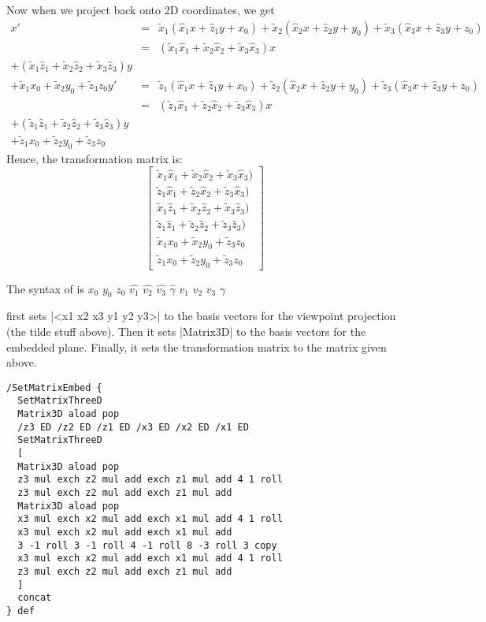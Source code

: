 \documentclass[11pt,english,BCOR10mm,DIV12,bibliography=totoc,parskip=false,smallheadings
    headexclude,footexclude,oneside,dvipsnames,svgnames]{pst-doc}
\begin{document}
 Now when we project back onto 2D coordinates, we get
 \begin{eqnarray*}
   x' & = & \tilde{x}_1(\hat{x}_1 x + \hat{z}_1 y + x_0) +
            \tilde{x}_2(\hat{x}_2 x + \hat{z}_2 y + y_0) +
            \tilde{x}_3(\hat{x}_3 x + \hat{z}_3 y + z_0)\\
   & = &
   (\tilde{x}_1\hat{x}_1 + \tilde{x}_2\hat{x}_2 + \tilde{x}_3\hat{x}_3) x\\
   + (\tilde{x}_1\hat{z}_1 + \tilde{x}_2\hat{z}_2 + \tilde{x}_3\hat{z}_3) y\\
   + \tilde{x}_1 x_0 + \tilde{x}_2 y_0 + \tilde{z}_3 z_0
   y' & = & \tilde{z}_1(\hat{x}_1 x + \hat{z}_1 y + x_0) +
            \tilde{z}_2(\hat{x}_2 x + \hat{z}_2 y + y_0) +
            \tilde{z}_3(\hat{x}_3 x + \hat{z}_3 y + z_0)\\
   & = &
   (\tilde{z}_1\hat{x}_1 + \tilde{z}_2\hat{x}_2 + \tilde{z}_3\hat{x}_3) x\\
   + (\tilde{z}_1\hat{z}_1 + \tilde{z}_2\hat{z}_2 + \tilde{z}_3\hat{z}_3) y\\
   + \tilde{z}_1 x_0 + \tilde{z}_2 y_0 + \tilde{z}_3 z_0
 \end{eqnarray*}
 Hence, the transformation matrix is:
 \[
   \left[ \begin{array}{c}
   \tilde{x}_1\hat{x}_1 + \tilde{x}_2\hat{x}_2 + \tilde{x}_3\hat{x}_3) \\
   \tilde{z}_1\hat{x}_1 + \tilde{z}_2\hat{x}_2 + \tilde{z}_3\hat{x}_3) \\
   \tilde{x}_1\hat{z}_1 + \tilde{x}_2\hat{z}_2 + \tilde{x}_3\hat{z}_3) \\
   \tilde{z}_1\hat{z}_1 + \tilde{z}_2\hat{z}_2 + \tilde{z}_3\hat{z}_3) \\
   \tilde{x}_1 x_0 + \tilde{x}_2 y_0 + \tilde{z}_3 z_0 \\
   \tilde{z}_1 x_0 + \tilde{z}_2 y_0 + \tilde{z}_3 z_0
   \end{array} \right]
 \]

The syntax of  is
   $x_0$ $y_0$ $z_0$ $\hat{v_1}$ $\hat{v_2}$ $\hat{v_3}$ $\hat{\gamma}$
   $v_1$ $v_2$ $v_3$ $\gamma$ 

 first sets |<x1 x2 x3 y1 y2 y3>| to the basis vectors for
 the viewpoint projection (the tilde stuff above). Then it sets |Matrix3D| to
 the basis vectors for the embedded plane. Finally, it sets the
 transformation matrix to the matrix given above.

\begin{lstlisting}
/SetMatrixEmbed {
  SetMatrixThreeD
  Matrix3D aload pop
  /z3 ED /z2 ED /z1 ED /x3 ED /x2 ED /x1 ED
  SetMatrixThreeD
  [
  Matrix3D aload pop
  z3 mul exch z2 mul add exch z1 mul add 4 1 roll
  z3 mul exch z2 mul add exch z1 mul add
  Matrix3D aload pop
  x3 mul exch x2 mul add exch x1 mul add 4 1 roll
  x3 mul exch x2 mul add exch x1 mul add
  3 -1 roll 3 -1 roll 4 -1 roll 8 -3 roll 3 copy
  x3 mul exch x2 mul add exch x1 mul add 4 1 roll
  z3 mul exch z2 mul add exch z1 mul add
  ]
  concat
} def
\end{lstlisting}
\end{document}
